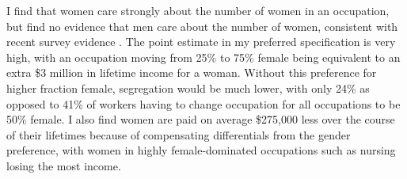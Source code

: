 \documentclass[12pt]{article}
\begin{document}
 
 





I find that women care strongly about the number of women in an occupation, but find no evidence that men care about the number of women, consistent with recent survey evidence \cite{Delfino2019}. The point estimate in my preferred specification is very high, with an occupation moving from 25\% to 75\% female being equivalent to an extra \$3 million in lifetime income for a woman. Without this preference for higher fraction female, segregation would be much lower, with only 24\% as opposed to 41\% of workers having to change occupation for all occupations to be 50\% female. I also find women are paid on average \$275,000 less over the course of their lifetimes because of compensating differentials from the gender preference, with women in highly female-dominated occupations such as nursing losing the most income.
\end{document}
